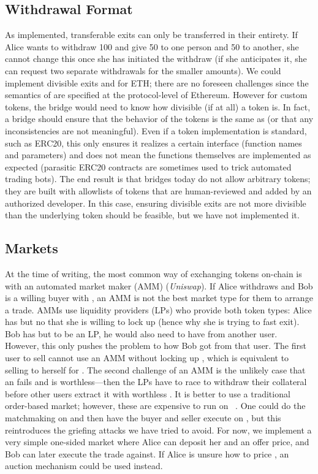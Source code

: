 \subsection{Withdrawal Format}

As implemented, transferable exits can only be transferred in their entirety. If Alice wants to withdraw 100 \ethtwo and give 50 \ethxx to one person and 50 \ethxx to another, she cannot change this once she has initiated the withdraw (if she anticipates it, she can request two separate withdrawals for the smaller amounts). We could implement divisible exits and for ETH; there are no foreseen challenges since the semantics of \ethone are specified at the protocol-level of Ethereum. However for custom tokens, the bridge would need to know how divisible (if at all) a token is. In fact, a bridge should ensure that the \layertwo  behavior of the tokens is the same as \layerone (or that any inconsistencies are not meaningful). Even if a token implementation is standard, such as ERC20, this only ensures it realizes a certain interface (function names and parameters) and does not mean the functions themselves are implemented as expected (parasitic ERC20 contracts are sometimes used to trick automated trading bots\textblue{~\cite{}}). The end result is that bridges today do not allow arbitrary tokens; they are built with allowlists of tokens that are human-reviewed and added by an authorized developer. In this case, ensuring divisible exits are not more divisible than the underlying token should be feasible, but we have not implemented it.

\subsection{Markets}
\label{sec:uniswap}

At the time of writing, the most common way of exchanging tokens on-chain is with an automated market maker (AMM) (\eg \textit{Uniswap}). If Alice withdraws \ethxx and Bob is a willing buyer with \ethone, an AMM is not the best market type for them to arrange a trade. AMMs use liquidity providers (LPs) who provide both token types: Alice has \ethxx but no \ethone that she is willing to lock up (hence why she is trying to fast exit). Bob has \ethone but to be an LP, he would also need to have \ethxx from another user. However, this only pushes the problem to how Bob got \ethxx from that user. The first user to sell \ethxx cannot use an AMM without locking up \ethone, which is equivalent to selling \ethxx to herself for \ethone. The second challenge of an AMM is the unlikely case that an \rblock fails and \ethxx is worthless---then the LPs have to race to withdraw their collateral before other users extract it with worthless \ethxx. It is better to use a traditional order-based market; however, these are expensive to run on \layerone~\cite{moosavi2021lissy}. One could do the matchmaking on \layertwo and then have the buyer and seller execute on \layerone, but this reintroduces the griefing attacks we have tried to avoid. For now, we implement a very simple one-sided market where Alice can deposit her \ethxx and an offer price, and Bob can later execute the trade against. If Alice is unsure how to price \ethxx, an auction mechanism could be used instead. 

